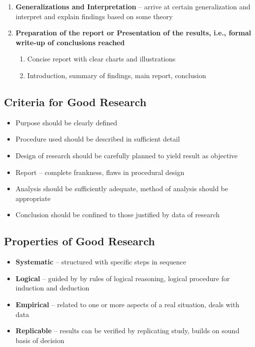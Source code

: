 \documentclass{article}
\begin{document}
\begin{enumerate}
    
    \item \textbf{Generalizations and Interpretation} -- arrive at certain generalization and interpret and explain findings based on some theory
    
    \item \textbf{Preparation of the report or Presentation of the results, i.e., formal write-up of conclusions reached}
        \begin{enumerate}
            \item Concise report with clear charts and illustrations
            \item Introduction, summary of findings, main report, conclusion
        \end{enumerate}
\end{enumerate}

\subsection{Criteria for Good Research}

\begin{itemize}
    \item Purpose should be clearly defined
    \item Procedure used should be described in sufficient detail
    \item Design of research should be carefully planned to yield result as objective
    \item Report – complete frankness, flaws in procedural design
    \item Analysis should be sufficiently adequate, method of analysis should be appropriate
    \item Conclusion should be confined to those justified by data of research
\end{itemize}

\subsection{Properties of Good Research}

\begin{itemize}
    \item \textbf{Systematic} -- structured with specific steps in sequence
    \item \textbf{Logical} -- guided by by rules of logical reasoning, logical procedure for induction and deduction
    \item \textbf{Empirical} -- related to one or more aspects of a real situation, deals with data
    \item \textbf{Replicable} -- results can be verified by replicating study, builds on sound basis of decision
\end{itemize}
\end{document}
